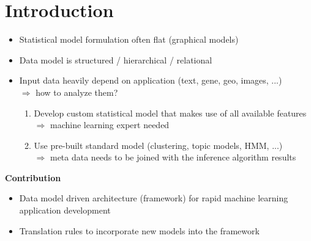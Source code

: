 \section{Introduction}

\begin{itemize}
\item Statistical model formulation often flat (graphical models)
\item Data model is structured / hierarchical / relational
\item Input data heavily depend on application (text, gene, geo, images, ...)\\
$\Rightarrow$ how to analyze them?
	\begin{enumerate}
	\item Develop custom statistical model that makes use of all available features\\
	$\Rightarrow$ machine learning expert needed
	\item Use pre-built standard model (clustering, topic models, HMM, ...)\\
	$\Rightarrow$ meta data needs to be joined with the inference algorithm results\\
	\end{enumerate}
\end{itemize}

\textbf{Contribution}
\begin{itemize}
\item Data model driven architecture (framework) for rapid machine learning application development
\item Translation rules to incorporate new models into the framework
\end{itemize}

